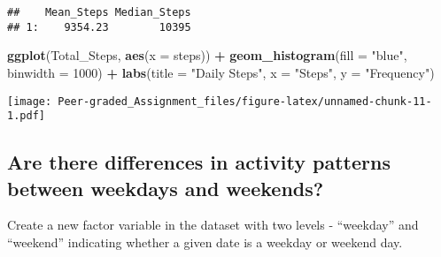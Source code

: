 \documentclass[
]{article}
\newenvironment{Shaded}{\begin{snugshade}}{\end{snugshade}}
\newcommand{\DataTypeTok}[1]{\textcolor[rgb]{0.13,0.29,0.53}{#1}}
\newcommand{\DecValTok}[1]{\textcolor[rgb]{0.00,0.00,0.81}{#1}}
\newcommand{\KeywordTok}[1]{\textcolor[rgb]{0.13,0.29,0.53}{\textbf{#1}}}
\newcommand{\NormalTok}[1]{#1}
\newcommand{\OperatorTok}[1]{\textcolor[rgb]{0.81,0.36,0.00}{\textbf{#1}}}
\newcommand{\StringTok}[1]{\textcolor[rgb]{0.31,0.60,0.02}{#1}}
\begin{document}
\begin{verbatim}
##    Mean_Steps Median_Steps
## 1:    9354.23        10395
\end{verbatim}

\begin{Shaded}
\begin{Highlighting}[]
\KeywordTok{ggplot}\NormalTok{(Total_Steps, }\KeywordTok{aes}\NormalTok{(}\DataTypeTok{x =}\NormalTok{ steps)) }\OperatorTok{+}\StringTok{ }\KeywordTok{geom_histogram}\NormalTok{(}\DataTypeTok{fill =} \StringTok{"blue"}\NormalTok{, }\DataTypeTok{binwidth =} \DecValTok{1000}\NormalTok{) }\OperatorTok{+}\StringTok{ }\KeywordTok{labs}\NormalTok{(}\DataTypeTok{title =} \StringTok{"Daily Steps"}\NormalTok{, }\DataTypeTok{x =} \StringTok{"Steps"}\NormalTok{, }\DataTypeTok{y =} \StringTok{"Frequency"}\NormalTok{)}
\end{Highlighting}
\end{Shaded}

\texttt{[image: Peer-graded\_Assignment\_files/figure-latex/unnamed-chunk-11-1.pdf]}

\hypertarget{are-there-differences-in-activity-patterns-between-weekdays-and-weekends}{%
\subsection{Are there differences in activity patterns between weekdays
and
weekends?}\label{are-there-differences-in-activity-patterns-between-weekdays-and-weekends}}

Create a new factor variable in the dataset with two levels -
``weekday'' and ``weekend'' indicating whether a given date is a weekday
or weekend day.
\end{document}
